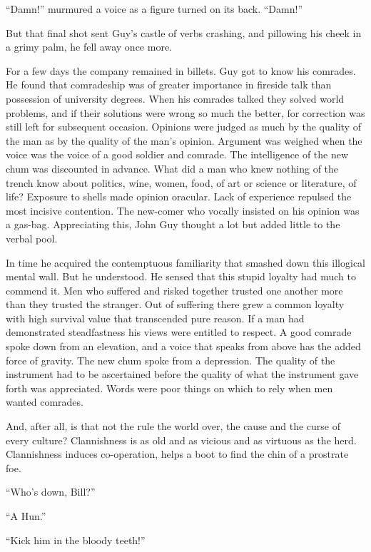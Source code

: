 ``Damn!'' murmured a voice as a figure turned on its back. ``Damn!''

But that final shot sent Guy's castle of verbs crashing, and pillowing his cheek in a grimy palm, he fell away once more.

For a few days the company remained in billets. Guy got to know his comrades. He found that comradeship was of greater importance in fireside talk than possession of university degrees. When his comrades talked they solved world problems, and if their solutions were wrong so much the better, for correction was still left for subsequent occasion. Opinions were judged as much by the quality of the man as by the quality of the man's opinion. Argument was weighed when the voice was the voice of a good soldier and comrade. The intelligence of the new chum was discounted in advance. What did a man who knew nothing of the trench know about politics, wine, women, food, of art or science or literature, of life? Exposure to shells made opinion oracular. Lack of experience repulsed the most incisive contention. The new-comer who vocally insisted on his opinion was a gas-bag. Appreciating this, John Guy thought a lot but added little to the verbal pool.

In time he acquired the contemptuous familiarity that smashed down this illogical mental wall. But he understood. He sensed that this stupid loyalty had much to commend it. Men who suffered and risked together trusted one another more than they trusted the stranger. Out of suffering there grew a common loyalty with high survival value that transcended pure reason. If a man had demonstrated steadfastness his views were entitled to respect. A good comrade spoke down from an elevation, and a voice that speaks from above has the added force of gravity. The new chum spoke from a depression. The quality of the instrument had to be ascertained before the quality of what the instrument gave forth was appreciated. Words were poor things on which to rely when men wanted comrades.

And, after all, is that not the rule the world over, the cause and the curse of every culture? Clannishness is as old and as vicious and as virtuous as the herd. Clannishness induces co-operation, helps a boot to find the chin of a prostrate foe.

``Who's down, Bill?''

``A Hun.''

``Kick him in the bloody teeth!''